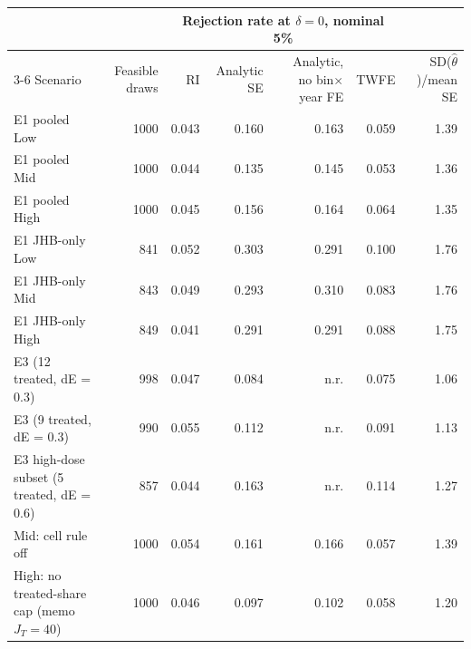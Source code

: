 \begin{tabular}{lrrrrrr}
\toprule
 & & \multicolumn{4}{c}{Rejection rate at $\delta = 0$, nominal 5\%} & \\
\cmidrule(lr){3-6}
Scenario & Feasible draws & RI & Analytic SE & Analytic, no bin$\times$year FE & TWFE & SD($\hat\theta$)/mean SE \\
\midrule
E1 pooled Low & 1000 & 0.043 & 0.160 & 0.163 & 0.059 & 1.39 \\
E1 pooled Mid & 1000 & 0.044 & 0.135 & 0.145 & 0.053 & 1.36 \\
E1 pooled High & 1000 & 0.045 & 0.156 & 0.164 & 0.064 & 1.35 \\
E1 JHB-only Low & 841 & 0.052 & 0.303 & 0.291 & 0.100 & 1.76 \\
E1 JHB-only Mid & 843 & 0.049 & 0.293 & 0.310 & 0.083 & 1.76 \\
E1 JHB-only High & 849 & 0.041 & 0.291 & 0.291 & 0.088 & 1.75 \\
E3 (12 treated, dE = 0.3) & 998 & 0.047 & 0.084 & n.r. & 0.075 & 1.06 \\
E3 (9 treated, dE = 0.3) & 990 & 0.055 & 0.112 & n.r. & 0.091 & 1.13 \\
E3 high-dose subset (5 treated, dE = 0.6) & 857 & 0.044 & 0.163 & n.r. & 0.114 & 1.27 \\
Mid: cell rule off & 1000 & 0.054 & 0.161 & 0.166 & 0.057 & 1.39 \\
High: no treated-share cap (memo $J_T = 40$) & 1000 & 0.046 & 0.097 & 0.102 & 0.058 & 1.20 \\
\bottomrule
\end{tabular}
